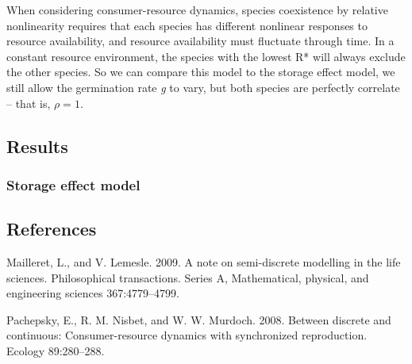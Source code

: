 \documentclass[12pt,]{article}
\begin{document}
When considering consumer-resource dynamics, species coexistence by
relative nonlinearity requires that each species has different nonlinear
responses to resource availability, and resource availability must
fluctuate through time. In a constant resource environment, the species
with the lowest R* will always exclude the other species. So we can
compare this model to the storage effect model, we still allow the
germination rate \emph{g} to vary, but both species are perfectly
correlate -- that is, \(\rho=1\).

\subsection{Results}\label{results}

\subsubsection{Storage effect model}\label{storage-effect-model}

\pagebreak{}

\subsection*{References}\label{references}

Mailleret, L., and V. Lemesle. 2009. A note on semi-discrete modelling
in the life sciences. Philosophical transactions. Series A,
Mathematical, physical, and engineering sciences 367:4779--4799.

Pachepsky, E., R. M. Nisbet, and W. W. Murdoch. 2008. Between discrete
and continuous: Consumer-resource dynamics with synchronized
reproduction. Ecology 89:280--288.
\end{document}
